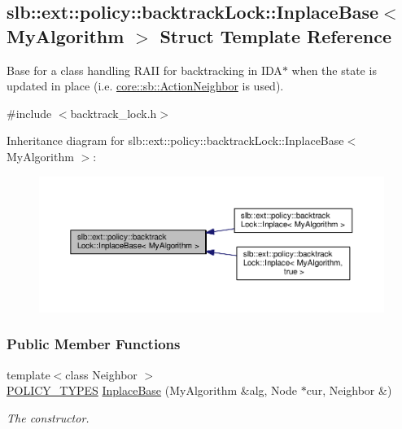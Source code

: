 \hypertarget{structslb_1_1ext_1_1policy_1_1backtrackLock_1_1InplaceBase}{}\subsection{slb\+:\+:ext\+:\+:policy\+:\+:backtrack\+Lock\+:\+:Inplace\+Base$<$ My\+Algorithm $>$ Struct Template Reference}
\label{structslb_1_1ext_1_1policy_1_1backtrackLock_1_1InplaceBase}


Base for a class handling R\+A\+II for backtracking in I\+D\+A$\ast$ when the state is updated in place (i.\+e. \hyperlink{structslb_1_1core_1_1sb_1_1ActionNeighbor}{core\+::sb\+::\+Action\+Neighbor} is used).  




{\ttfamily \#include $<$backtrack\+\_\+lock.\+h$>$}



Inheritance diagram for slb\+:\+:ext\+:\+:policy\+:\+:backtrack\+Lock\+:\+:Inplace\+Base$<$ My\+Algorithm $>$\+:\nopagebreak
\begin{figure}[H]
\begin{center}
\leavevmode
\includegraphics[width=350pt]{structslb_1_1ext_1_1policy_1_1backtrackLock_1_1InplaceBase__inherit__graph}
\end{center}
\end{figure}
\subsubsection*{Public Member Functions}
\begin{DoxyCompactItemize}
\item 
{\footnotesize template$<$class Neighbor $>$ }\\\hyperlink{extensions_2shared__policies_2headers_8h_ae70a06fa4631780beea14971eb36a562}{P\+O\+L\+I\+C\+Y\+\_\+\+T\+Y\+P\+ES} \hyperlink{structslb_1_1ext_1_1policy_1_1backtrackLock_1_1InplaceBase_a2c4eebd972539d487b44ffe23ebc4aff}{Inplace\+Base} (My\+Algorithm \&alg, Node $\ast$cur, Neighbor \&)
\begin{DoxyCompactList}\small\item\em The constructor. \end{DoxyCompactList}\end{DoxyCompactItemize}
